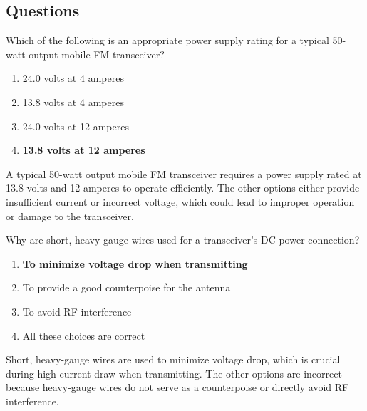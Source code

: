 \subsection*{Questions}

\begin{tcolorbox}[colback=gray!10!white,colframe=black!75!black,title={T4A01}]
    Which of the following is an appropriate power supply rating for a typical 50-watt output mobile FM transceiver?
    \begin{enumerate}[label=\Alph*,noitemsep]
        \item 24.0 volts at 4 amperes
        \item 13.8 volts at 4 amperes
        \item 24.0 volts at 12 amperes
        \item \textbf{13.8 volts at 12 amperes}
    \end{enumerate}
\end{tcolorbox}
A typical 50-watt output mobile FM transceiver requires a power supply rated at 13.8 volts and 12 amperes to operate efficiently. The other options either provide insufficient current or incorrect voltage, which could lead to improper operation or damage to the transceiver.


\begin{tcolorbox}[colback=gray!10!white,colframe=black!75!black,title={T4A03}]
    Why are short, heavy-gauge wires used for a transceiver’s DC power connection?
    \begin{enumerate}[label=\Alph*,noitemsep]
        \item \textbf{To minimize voltage drop when transmitting}
        \item To provide a good counterpoise for the antenna
        \item To avoid RF interference
        \item All these choices are correct
    \end{enumerate}
\end{tcolorbox}
Short, heavy-gauge wires are used to minimize voltage drop, which is crucial during high current draw when transmitting. The other options are incorrect because heavy-gauge wires do not serve as a counterpoise or directly avoid RF interference.


